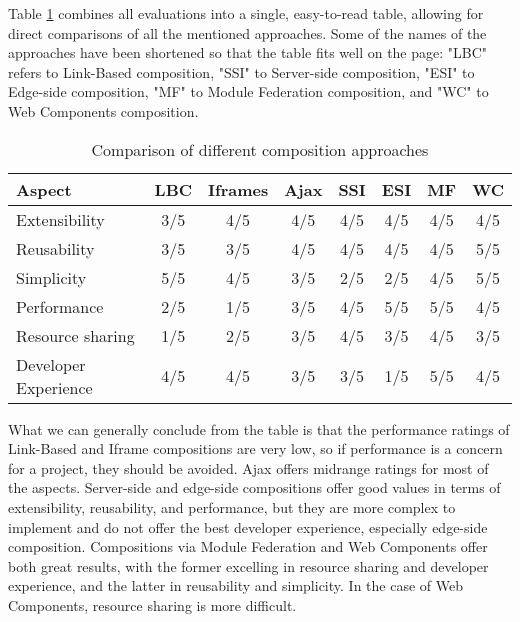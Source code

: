 Table \ref{table:composition-comparison} combines all evaluations into a single, easy-to-read table, allowing for direct comparisons of all the mentioned approaches. Some of the names of the approaches have been shortened so that the table fits well on the page: "LBC" refers to Link-Based composition, "SSI" to Server-side composition, "ESI" to Edge-side composition, "MF" to Module Federation composition, and "WC" to Web Components composition. 
\begin{table}[h]
  \centering
  \begin{tabular}{|p{3cm}|c|c|c|c|c|c|c|}
    \hline
      \textbf{Aspect} & \textbf{LBC} & \textbf{Iframes} & \textbf{Ajax} & \textbf{SSI} & \textbf{ESI} & \textbf{MF} & \textbf{WC} \\
    \hline
      Extensibility & 3/5 & 4/5 & 4/5 & 4/5 & 4/5 & 4/5 & 4/5 \\
    \hline
      Reusability & 3/5 & 3/5 & 4/5 & 4/5 & 4/5 & 4/5 & 5/5 \\
    \hline
      Simplicity & 5/5 & 4/5 & 3/5 & 2/5 & 2/5 & 4/5 & 5/5 \\
    \hline
      Performance & 2/5 & 1/5 & 3/5 & 4/5 & 5/5 & 5/5 & 4/5 \\
    \hline
      Resource sharing & 1/5 & 2/5 & 3/5 & 4/5 & 3/5 & 4/5 & 3/5 \\
    \hline
      Developer Experience & 4/5 & 4/5 & 3/5 & 3/5 & 1/5 & 5/5 & 4/5 \\
    \hline
  \end{tabular}
  \caption{Comparison of different composition approaches}
  \label{table:composition-comparison}
\end{table}

What we can generally conclude from the table is that the performance ratings of Link-Based and Iframe compositions are very low, so if performance is a concern for a project, they should be avoided. Ajax offers midrange ratings for most of the aspects. Server-side and edge-side compositions offer good values in terms of extensibility, reusability, and performance, but they are more complex to implement and do not offer the best developer experience, especially edge-side composition. Compositions via Module Federation and Web Components offer both great results, with the former excelling in resource sharing and developer experience, and the latter in reusability and simplicity. In the case of Web Components, resource sharing is more difficult.

